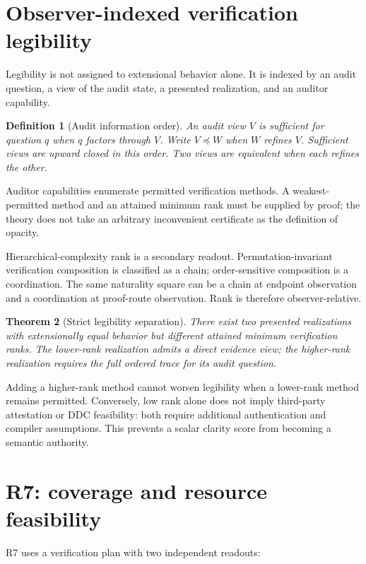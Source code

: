 \documentclass[11pt]{article}
\newtheorem{definition}{Definition}[section]
\newtheorem{theorem}[definition]{Theorem}
\begin{document}
\section{Observer-indexed verification legibility}

Legibility is not assigned to extensional behavior alone.  It is indexed by an
audit question, a view of the audit state, a presented realization, and an
auditor capability.

\begin{definition}[Audit information order]
An audit view $V$ is sufficient for question $q$ when $q$ factors through
$V$.  Write $V\preceq W$ when $W$ refines $V$.  Sufficient views are upward
closed in this order.  Two views are equivalent when each refines the other.
\end{definition}

Auditor capabilities enumerate permitted verification methods.  A
weakest-permitted method and an attained minimum rank must be supplied by
proof; the theory does not take an arbitrary inconvenient certificate as the
definition of opacity.

Hierarchical-complexity rank is a secondary readout.  Permutation-invariant
verification composition is classified as a chain; order-sensitive
composition is a coordination.  The same naturality square can be a chain at
endpoint observation and a coordination at proof-route observation.  Rank is
therefore observer-relative.

\begin{theorem}[Strict legibility separation]
There exist two presented realizations with extensionally equal behavior but
different attained minimum verification ranks.  The lower-rank realization
admits a direct evidence view; the higher-rank realization requires the full
ordered trace for its audit question.
\end{theorem}

Adding a higher-rank method cannot worsen legibility when a lower-rank method
remains permitted.  Conversely, low rank alone does not imply third-party
attestation or DDC feasibility: both require additional authentication and
compiler assumptions.  This prevents a scalar clarity score from becoming a
semantic authority.

\section{R7: coverage and resource feasibility}

R7 uses a verification plan with two independent readouts:
\end{document}
